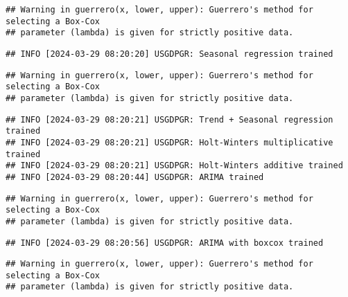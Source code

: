 \documentclass[
]{article}
\begin{document}
\begin{verbatim}
## Warning in guerrero(x, lower, upper): Guerrero's method for selecting a Box-Cox
## parameter (lambda) is given for strictly positive data.
\end{verbatim}

\begin{verbatim}
## INFO [2024-03-29 08:20:20] USGDPGR: Seasonal regression trained
\end{verbatim}

\begin{verbatim}
## Warning in guerrero(x, lower, upper): Guerrero's method for selecting a Box-Cox
## parameter (lambda) is given for strictly positive data.
\end{verbatim}

\begin{verbatim}
## INFO [2024-03-29 08:20:21] USGDPGR: Trend + Seasonal regression trained
## INFO [2024-03-29 08:20:21] USGDPGR: Holt-Winters multiplicative trained
## INFO [2024-03-29 08:20:21] USGDPGR: Holt-Winters additive trained
## INFO [2024-03-29 08:20:44] USGDPGR: ARIMA trained
\end{verbatim}

\begin{verbatim}
## Warning in guerrero(x, lower, upper): Guerrero's method for selecting a Box-Cox
## parameter (lambda) is given for strictly positive data.
\end{verbatim}

\begin{verbatim}
## INFO [2024-03-29 08:20:56] USGDPGR: ARIMA with boxcox trained
\end{verbatim}

\begin{verbatim}
## Warning in guerrero(x, lower, upper): Guerrero's method for selecting a Box-Cox
## parameter (lambda) is given for strictly positive data.
\end{verbatim}
\end{document}

